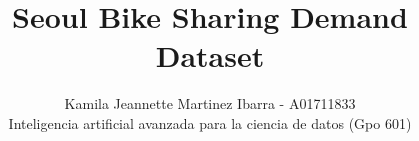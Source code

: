 \documentclass[10pt,journal,compsoc]{IEEEtran}
\begin{document}
%
\title{
Seoul Bike Sharing Demand Dataset}
%
%
%
%

\author{Kamila Jeannette Martinez Ibarra - A01711833
\\ Inteligencia artificial avanzada para la ciencia de datos (Gpo 601)
}

% 
%
\end{document}
